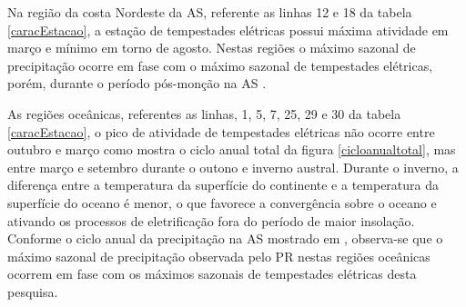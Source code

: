 


Na região da costa Nordeste da AS, referente as linhas 12 e 18 da tabela \ref{caracEstacao}, a estação de tempestades elétricas possui máxima atividade em março e mínimo em torno de agosto. Nestas regiões o máximo sazonal de precipitação ocorre em fase com o máximo sazonal de tempestades elétricas, porém, durante o período pós-monção na AS \cite{grimm2003nino,reboita2010regimes,shi-atlas,bombardi2008variabilidade,cusdodioTese}.

As regiões oceânicas, referentes as linhas, 1, 5, 7, 25, 29 e 30 da tabela \ref{caracEstacao}, o pico de atividade de tempestades elétricas não ocorre entre outubro e março como mostra o ciclo anual total da figura \ref{cicloanualtotal}, mas entre março e setembro durante o outono e inverno austral.  Durante o inverno, a diferença entre a temperatura da superfície do continente e a temperatura da superfície do oceano é menor, o que favorece a convergência  sobre o oceano e ativando os processos de eletrificação fora do período de maior insolação. Conforme o ciclo anual da precipitação na AS mostrado em , observa-se que o máximo sazonal de precipitação observada pelo PR nestas regiões oceânicas ocorrem em fase com os máximos sazonais de tempestades elétricas desta pesquisa. 

